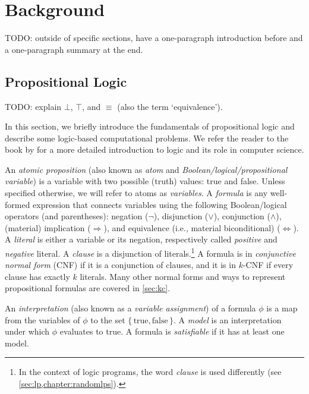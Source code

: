 \chapter{Background}

TODO: outside of specific sections, have a one-paragraph introduction before and a one-paragraph summary at the end.

\section{Propositional Logic} \label{sec:proplogic}

TODO: explain $\bot$, $\top$, and $\equiv$ (also the term `equivalence').

In this section, we briefly introduce the fundamentals of propositional logic and describe some logic-based computational problems. We refer the reader to the book by \citet{DBLP:books/daglib/0029942} for a more detailed introduction to logic and its role in computer science.

An \emph{atomic proposition} (also known as \emph{atom} and \emph{Boolean/logical/propositional variable}) is a variable with two possible (truth) values: true and false. Unless specified otherwise, we will refer to atoms as \emph{variables}. A \emph{formula} is any well-formed expression that connects variables using the following Boolean/logical operators (and parentheses): negation ($\neg$), disjunction ($\lor$), conjunction ($\land$), (material) implication ($\Rightarrow$), and equivalence (i.e., material biconditional) ($\Leftrightarrow$). A \emph{literal} is either a variable or its negation, respectively called \emph{positive} and \emph{negative} literal. A \emph{clause} is a disjunction of literals.\footnote{In the context of logic programs, the word \emph{clause} is used differently (see \cref{sec:lp,chapter:randomlps}).} A formula is in \emph{conjunctive normal form} (CNF) if it is a conjunction of clauses, and it is in $k$-CNF if every clause has exactly $k$ literals. Many other normal forms and ways to represent propositional formulas are covered in \cref{sec:kc}.

An \emph{interpretation} (also known as a \emph{variable assignment}) of a formula $\phi$ is a map from the variables of $\phi$ to the set $\{\, \text{true}, \text{false} \,\}$. A \emph{model} is an interpretation under which $\phi$ evaluates to true. A formula is \emph{satisfiable} if it has at least one model.

